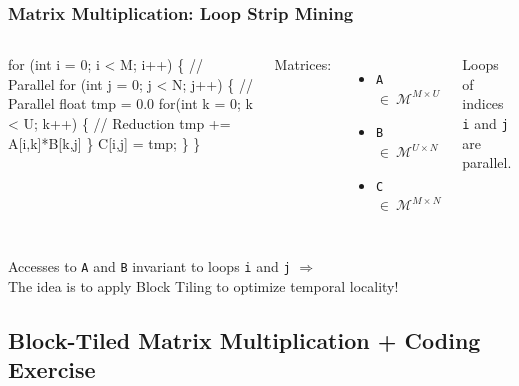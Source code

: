 \documentclass{beamer}
\renewcommand{\emph}[1]{\textcolor{CosGreen}{ #1}}
\newcommand{\emp}[1]{\textcolor{DikuRed}{ #1}}
\newcommand{\emphh}[1]{\textcolor{CosGreen}{ #1}}
\begin{document}
\begin{frame}[fragile,t]
  \frametitle{Matrix Multiplication: Loop Strip Mining}

\begin{columns}
\begin{colorcode}[fontsize=\scriptsize]
for (int i = 0; i < M; i++) \{  \emphh{// Parallel}
  for (int j = 0; j < N; j++) \{  \emphh{// Parallel}
    float tmp = 0.0
    for(int k = 0; k < U; k++) \{ \emp{// Reduction}
      tmp += A[i,k]*B[k,j] 
    \}
    C[i,j] = tmp;          
  \}
\}
\end{colorcode}
Matrices:
\begin{itemize}
    \item {\tt A $\in~\mathcal{M}^{M \times U}$}
    \item {\tt B $\in~\mathcal{M}^{U \times N}$}
    \item {\tt C$\in~\mathcal{M}^{M \times N}$} 
\end{itemize}
Loops of indices {\tt i} and {\tt j} are parallel.
\end{columns}

\bigskip

Accesses to {\tt A} and {\tt B} invariant to loops {\tt i} and {\tt j} $\Rightarrow$\\
\emph{The idea is to apply Block Tiling to optimize temporal locality!}  
\end{frame}

\subsection{Block-Tiled Matrix Multiplication + Coding Exercise}
\end{document}
